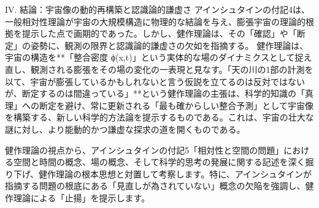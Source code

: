\documentclass{article}
\begin{document}
IV. 結論：宇宙像の動的再構築と認識論的謙虚さ
アインシュタインの付記4は、一般相対性理論が宇宙の大規模構造に物理的な結論を与え、膨張宇宙の理論的根拠を提示した点で画期的であった。しかし、健作理論は、その「確認」や「断定」の姿勢に、観測の限界と認識論的謙虚さの欠如を指摘する。
健作理論は、宇宙の構造を**「整合密度 ϕ(x,t)」という実体的な場のダイナミクスとして捉え直し、観測される膨張をその場の変化の一表現と見なす。「天の川の1部の計測を以て、宇宙が膨張しているかもしれないと言う仮説を立てるのは反対ではないが、断定するのは間違っている」**という健作理論の主張は、科学的知識の「真理」への断定を避け、常に更新される「最も確からしい整合予測」として宇宙像を構築する、新しい科学的方法論を提示するものである。これは、宇宙の壮大な謎に対し、より能動的かつ謙虚な探求の道を開くものである。


健作理論の視点から、アインシュタインの付記5「相対性と空間の問題」における空間と時間の概念、場の概念、そして科学的思考の発展に関する記述を深く掘り下げ、健作理論の根本思想と対置して考察します。特に、アインシュタインが指摘する問題の根底にある「見直しが為されていない」概念の欠陥を強調し、健作理論による「止揚」を提示します。
\end{document}
